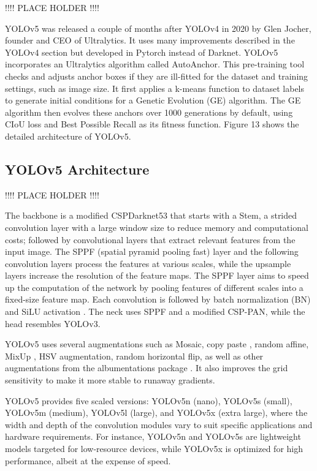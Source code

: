\documentclass{article}
\begin{document}
!!!! PLACE HOLDER !!!!

YOLOv5 \cite{Jocher_YOLOv5_by_Ultralytics_2020} was released a couple of months after YOLOv4 in 2020 by Glen Jocher, founder and CEO of Ultralytics. It uses many improvements described in the YOLOv4 section but developed in Pytorch instead of Darknet. YOLOv5 incorporates an Ultralytics algorithm called AutoAnchor. This pre-training tool checks and adjusts anchor boxes if they are ill-fitted for the dataset and training settings, such as image size. It first applies a k-means function to dataset labels to generate initial conditions for a Genetic Evolution (GE) algorithm. The GE algorithm then evolves these anchors over 1000 generations by default, using CIoU loss \cite{zheng2020distance} and Best Possible Recall as its fitness function. Figure 13 shows the detailed architecture of YOLOv5.

\subsection{YOLOv5 Architecture}

!!!! PLACE HOLDER !!!!

The backbone is a modified CSPDarknet53 that starts with a Stem, a strided convolution layer with a large window size to reduce memory and computational costs; followed by convolutional layers that extract relevant features from the input image. The SPPF (spatial pyramid pooling fast) layer and the following convolution layers process the features at various scales, while the upsample layers increase the resolution of the feature maps. The SPPF layer aims to speed up the computation of the network by pooling features of different scales into a fixed-size feature map. Each convolution is followed by batch normalization (BN) and SiLU activation \cite{hendrycks2016gaussian}. The neck uses SPPF and a modified CSP-PAN, while the head resembles YOLOv3.

YOLOv5 uses several augmentations such as Mosaic, copy paste \cite{ghiasi2021simple}, random affine, MixUp \cite{zhang2017mixup}, HSV augmentation, random horizontal flip, as well as other augmentations from the albumentations package \cite{buslaev2020albumentations}. It also improves the grid sensitivity to make it more stable to runaway gradients.

YOLOv5 provides five scaled versions: YOLOv5n (nano), YOLOv5s (small), YOLOv5m (medium), YOLOv5l (large), and YOLOv5x (extra large), where the width and depth of the convolution modules vary to suit specific applications and hardware requirements. For instance, YOLOv5n and YOLOv5s are lightweight models targeted for low-resource devices, while YOLOv5x is optimized for high performance, albeit at the expense of speed.
\end{document}
